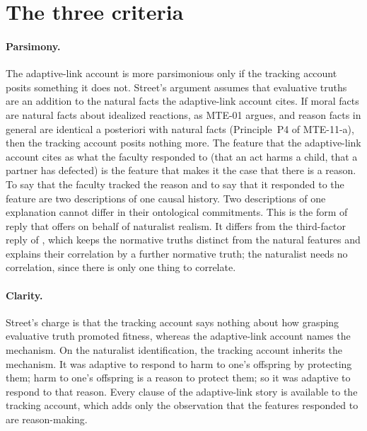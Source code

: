 \documentclass{situationist-preprint}
\begin{document}
\section{The three criteria}

\paragraph{Parsimony.} The adaptive-link account is more parsimonious only if the tracking account posits something it does not. Street's argument assumes that evaluative truths are an addition to the natural facts the adaptive-link account cites. If moral facts are natural facts about idealized reactions, as MTE-01 argues, and reason facts in general are identical a posteriori with natural facts (Principle~P4 of MTE-11-a), then the tracking account posits nothing more. The feature that the adaptive-link account cites as what the faculty responded to (that an act harms a child, that a partner has defected) is the feature that makes it the case that there is a reason. To say that the faculty tracked the reason and to say that it responded to the feature are two descriptions of one causal history. Two descriptions of one explanation cannot differ in their ontological commitments. This is the form of reply that \citet{Copp2008} offers on behalf of naturalist realism. It differs from the third-factor reply of \citet{Enoch2010}, which keeps the normative truths distinct from the natural features and explains their correlation by a further normative truth; the naturalist needs no correlation, since there is only one thing to correlate.

\paragraph{Clarity.} Street's charge is that the tracking account says nothing about how grasping evaluative truth promoted fitness, whereas the adaptive-link account names the mechanism. On the naturalist identification, the tracking account inherits the mechanism. It was adaptive to respond to harm to one's offspring by protecting them; harm to one's offspring is a reason to protect them; so it was adaptive to respond to that reason. Every clause of the adaptive-link story is available to the tracking account, which adds only the observation that the features responded to are reason-making.
\end{document}

